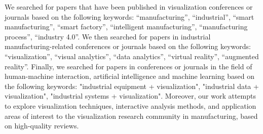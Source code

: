 \documentclass[a4paper,fleqn]{cas-dc}
\begin{document}
We searched for papers that have been published in visualization conferences or journals based on the following keywords: ``manufacturing'', ``industrial'', ``smart manufacturing'', ``smart factory'', ``intelligent manufacturing'', ``manufacturing process'', ``industry 4.0''.
We then searched for papers in industrial manufacturing-related conferences or journals based on the following keywords: ``visualization'', ``visual analytics'', ``data analytics'', ``virtual reality'', ``augmented reality''.
Finally, we searched for papers in conferences or journals in the field of human-machine interaction, artificial intelligence and machine learning based on the following keywords: "industrial equipment + visualization", "industrial data + visualization", "industrial systems + visualization".
Moreover, our work attempts to explore visualization techniques, interactive analysis methods, and application areas of interest to the visualization research community in manufacturing, based on high-quality reviews.


\end{document}
